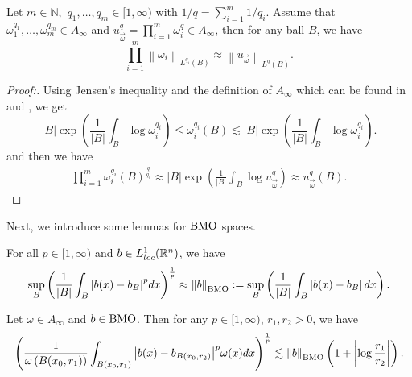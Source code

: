 \documentclass[11pt, twoside, leqno]{article}
\begin{document}
\begin{lem}\label{cen4}
	Let $m\in \mathbb{N},$ $q_1,\ldots,q_m\in[1,\infty)$ with $1/q=\sum_{i=1}^m 1/{q_i}$. Assume that $\omega _1^{{q_1}}, \ldots ,\omega _m^{{q_m}} \in {A_\infty }$ and $u_{\vec \omega }^q = \prod\limits_{i = 1}^m {\omega _i^q}  \in {A_\infty }$, then for any ball $B$, we have
	\begin{equation*}\label{N1}
	\prod\limits_{i = 1}^m {{{\left\| {{\omega _i}} \right\|}_{{L^{{q_i}}}(B)}}}  \approx {\left\| {{u_{\vec \omega }}} \right\|_{{L^q}(B)}}.
	\end{equation*}
	\begin{proof}[Proof:]
		Using Jensen's inequality and the definition of ${A_\infty }$ which can be found in \cite[p. 12]{Gra1} and \cite[p. 525]{Gra1}, we get
		\begin{equation*}
		\left| B \right|\exp (\frac{1}{{\left| B \right|}}\int_B {\log \omega _i^{{q_i}}} ) \le \omega _i^{{q_i}}(B) \lesssim \left| B \right|\exp (\frac{1}{{\left| B \right|}}\int_B {\log \omega _i^{{q_i}}} ).
		\end{equation*}
		and then we have
		\begin{align*}
		\prod\limits_{i = 1}^m {\omega _i^{{q_i}}{{(B)}^{\frac{q}{{{q_i}}}}}}  \approx \left| B \right|\exp (\frac{1}{{\left| B \right|}}\int_B {\log u_{\vec \omega }^q} ) \approx u_{\vec \omega }^q(B).
		\end{align*}
	\end{proof}
\end{lem}
Next, we introduce some lemmas for ${\rm BMO}$ spaces.
\begin{lem}
	For all $p \in [1,\infty )$ and $b \in L_{loc}^1({\mathbb R^n})$, we have
	\begin{equation*}
	\mathop {\sup }\limits_B {\left(\frac{1}{{\left| B \right|}}\int_B^{} {{{\left| {b(x) - {b_B}} \right|}^p}dx} \right)^{\frac{1}{p}}} \approx {\left\| b \right\|_{\rm BMO}}:=\mathop {\sup }\limits_B \left(\frac{1}{{\left| B \right|}}\int_B^{} {\left| {b(x) - {b_B}} \right|dx} \right).
	\end{equation*}
\end{lem}

\begin{lem}[\cite{Gu1}]\label{Gu1}
	Let $\omega\in A_{\infty}$ and $b \in {\rm BMO}$. Then for any $p \in [1,\infty )$, $r_1, r_2 >0$, we have
	\begin{equation*}
	{\left( {\frac{1}{{\omega \left( {B({x_0},{r_1})} \right)}}\int_{B({x_0},{r_1})} {{{\left| {b(x) - {b_{B({x_0},{r_2})}}} \right|}^p}\omega (x)dx} } \right)^{\frac{1}{p}}} \lesssim {\left\| b \right\|_{\rm BMO}}\left( {1 + \left| {\log \frac{{{r_1}}}{{{r_2}}}} \right|} \right).
	\end{equation*}
\end{lem}
\end{document}
